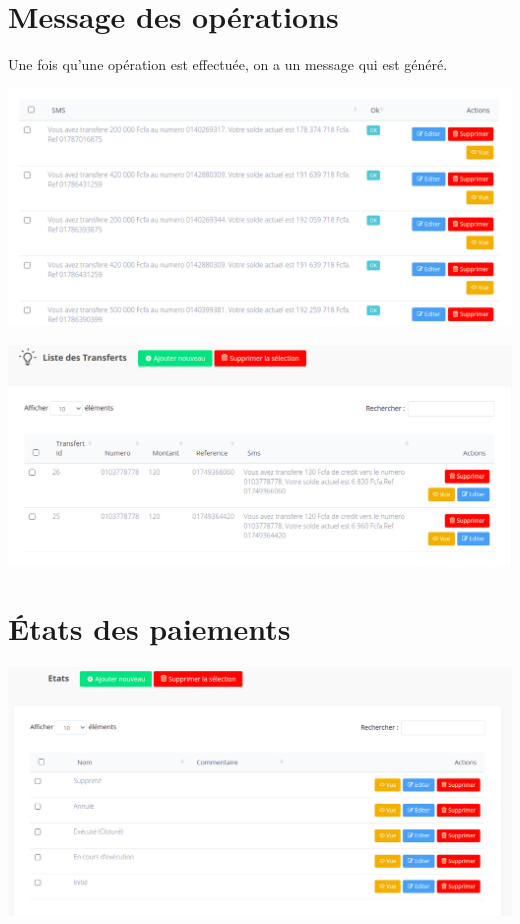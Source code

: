 	\section{Message des opérations}
		Une fois qu'une opération est effectuée, on a un message qui est généré.
		\begin{center}
			\includegraphics[scale=0.5]{chap_3/message_1.png}
			\label{message}
		\end{center}
		\begin{center}
			\includegraphics[scale=0.5]{chap_3/message_2.png}
			\label{message_transfert}
		\end{center}
	\section{États des paiements}
		\begin{center}
			\includegraphics[scale=0.5]{chap_3/etat_de_paiement.png}
			\label{etat_de_paiement}
		\end{center}